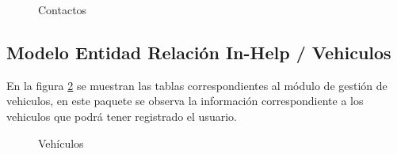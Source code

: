 \begin{figure}[htbp!]
	\centering
	\caption{Contactos}
	\label{fig:BD_Contactos}
\end{figure}
\subsection{Modelo Entidad Relación In-Help / Vehiculos}
En la figura \ref{fig:BD_Vehiculo} se muestran las tablas correspondientes al módulo de gestión de vehiculos, en este paquete se observa la información correspondiente a los vehiculos que podrá tener registrado el usuario.
\begin{figure}[htbp!]
	\centering
	\caption{Vehículos}
	\label{fig:BD_Vehiculo}
\end{figure}
